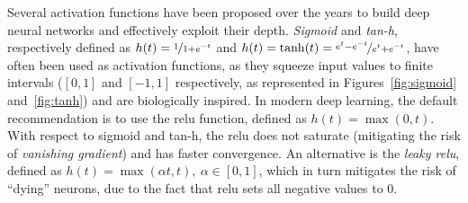 \documentclass[%
    corpo=12pt,
    twoside,
    stile=classica,   
    tipotesi=magistrale,
    evenboxes,
    english,
	numerazioneromana,
]{toptesi}
\newcommand{\quotes}[1]{``#1''}
\begin{document}
\bigskip
Several activation functions have been proposed over the years to build deep neural networks and effectively exploit their depth. \textit{Sigmoid} and \textit{tan-h}, respectively defined as $h(t) = \nicefrac{1}{1 + e^{-t}}$ and $h(t) = \tanh(t) = \nicefrac{e^t - e^{-t}}{e^t + e^{-t}}$, have often been used as activation functions, as they squeeze input values to finite intervals ($[0,1]$ and $[-1,1]$ respectively, as represented in Figures~\ref{fig:sigmoid} and~\ref{fig:tanh}) and are biologically inspired. In modern deep learning, the default recommendation is to use the \gls{relu} function, defined as $h(t) = \max(0,t)$. With respect to sigmoid and tan-h, the \gls{relu} does not saturate (mitigating the risk of \textit{vanishing gradient}) and has faster convergence. An alternative is the \textit{leaky \gls{relu}}, defined as $h(t) = \max(\alpha t, t),\ \alpha \in [0,1]$, which in turn mitigates the risk of \quotes{dying} neurons, due to the fact that \gls{relu} sets all negative values to $0$.
\end{document}
